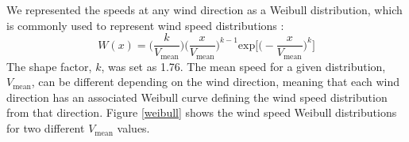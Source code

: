 

We represented the speeds at any wind direction as a Weibull distribution, which is commonly used to represent wind speed distributions \citep{justus1978methods,rehman1994weibull,dorvlo2002estimating}: 
\begin{equation}
W(x) = \Big(\frac{k}{V_{\text{mean}}}\Big)\Big(\frac{x}{V_{\text{mean}}}\Big)^{k-1}\text{exp}\Big[\Big(-\frac{x}{V_{\text{mean}}}\Big)^k\Big]
\end{equation}
The shape factor, $k$, was set as 1.76. 
The mean speed for a given distribution, $V_{\text{mean}}$, can be different depending on the wind direction, meaning that each wind direction has an associated Weibull curve defining the wind speed distribution from that direction. 
Figure \ref{weibull} shows the wind speed Weibull distributions for two different $V_{\text{mean}}$ values. 

